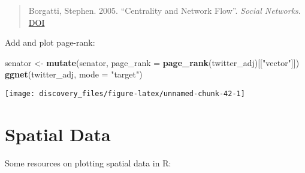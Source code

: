 \documentclass[]{book}
\newenvironment{Shaded}{\begin{snugshade}}{\end{snugshade}}
\newcommand{\DataTypeTok}[1]{\textcolor[rgb]{0.13,0.29,0.53}{#1}}
\newcommand{\KeywordTok}[1]{\textcolor[rgb]{0.13,0.29,0.53}{\textbf{#1}}}
\newcommand{\NormalTok}[1]{#1}
\newcommand{\StringTok}[1]{\textcolor[rgb]{0.31,0.60,0.02}{#1}}
\theoremstyle{definition}
\theoremstyle{definition}
\theoremstyle{definition}
\theoremstyle{remark}
\begin{document}
\begin{quote}
Borgatti, Stephen. 2005. ``Centrality and Network Flow''. \emph{Social
Networks}.
\href{https://dx.doi.org/doi:10.1016/j.socnet.2004.11.008}{DOI}
\end{quote}

Add and plot page-rank:

\begin{Shaded}
\begin{Highlighting}[]
\NormalTok{senator <-}\StringTok{ }\KeywordTok{mutate}\NormalTok{(senator, }\DataTypeTok{page_rank =} \KeywordTok{page_rank}\NormalTok{(twitter_adj)[[}\StringTok{"vector"}\NormalTok{]])}
\KeywordTok{ggnet}\NormalTok{(twitter_adj, }\DataTypeTok{mode =} \StringTok{"target"}\NormalTok{)}
\end{Highlighting}
\end{Shaded}

\begin{center}\texttt{[image: discovery\_files/figure-latex/unnamed-chunk-42-1]} \end{center}

\hypertarget{spatial-data}{%
\section{Spatial Data}\label{spatial-data}}

Some resources on plotting spatial data in R:
\end{document}
